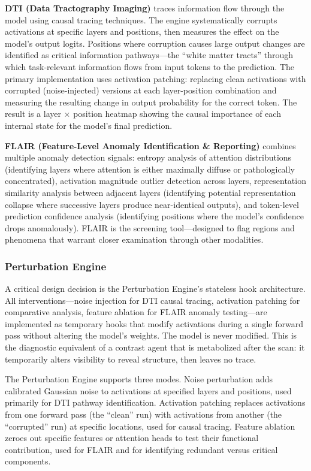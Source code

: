 \documentclass[11pt]{article}
\begin{document}
\textbf{DTI (Data Tractography Imaging)} traces information flow through the model using causal tracing techniques. The engine systematically corrupts activations at specific layers and positions, then measures the effect on the model's output logits. Positions where corruption causes large output changes are identified as critical information pathways---the ``white matter tracts'' through which task-relevant information flows from input tokens to the prediction. The primary implementation uses activation patching: replacing clean activations with corrupted (noise-injected) versions at each layer-position combination and measuring the resulting change in output probability for the correct token. The result is a layer $\times$ position heatmap showing the causal importance of each internal state for the model's final prediction.

\textbf{FLAIR (Feature-Level Anomaly Identification \& Reporting)} combines multiple anomaly detection signals: entropy analysis of attention distributions (identifying layers where attention is either maximally diffuse or pathologically concentrated), activation magnitude outlier detection across layers, representation similarity analysis between adjacent layers (identifying potential representation collapse where successive layers produce near-identical outputs), and token-level prediction confidence analysis (identifying positions where the model's confidence drops anomalously). FLAIR is the screening tool---designed to flag regions and phenomena that warrant closer examination through other modalities.

\subsubsection{Perturbation Engine}

A critical design decision is the Perturbation Engine's stateless hook architecture. All interventions---noise injection for DTI causal tracing, activation patching for comparative analysis, feature ablation for FLAIR anomaly testing---are implemented as temporary hooks that modify activations during a single forward pass without altering the model's weights. The model is never modified. This is the diagnostic equivalent of a contrast agent that is metabolized after the scan: it temporarily alters visibility to reveal structure, then leaves no trace.

The Perturbation Engine supports three modes. Noise perturbation adds calibrated Gaussian noise to activations at specified layers and positions, used primarily for DTI pathway identification. Activation patching replaces activations from one forward pass (the ``clean'' run) with activations from another (the ``corrupted'' run) at specific locations, used for causal tracing. Feature ablation zeroes out specific features or attention heads to test their functional contribution, used for FLAIR and for identifying redundant versus critical components.
\end{document}
